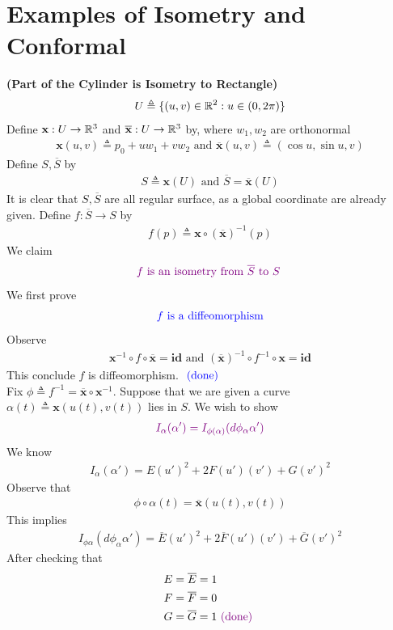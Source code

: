 \documentclass{report}
\begin{document}
\section{Examples of Isometry and Conformal}
\begin{Example}{\textbf{(Part of the Cylinder is Isometry to Rectangle)}}{}
\begin{align*}
U\triangleq \{ (u,v)\in\mathbb{R}^2: u \in (0,2\pi) \}
\end{align*}
Define $\textbf{x}:U\rightarrow \mathbb{R}^3$ and $\overline{\textbf{x}}:U\rightarrow \mathbb{R}^3$ by, where $w_1,w_2$ are orthonormal
\begin{align*}
\textbf{x}(u,v)\triangleq p_0+ uw_1+vw_2 \text{ and } \overline{\textbf{x}}(u,v)\triangleq (\cos u , \sin u , v)
\end{align*}
Define $S,\overline{S}$ by 
\begin{align*}
S\triangleq \textbf{x}(U)\text{ and } \overline{S}=\overline{\textbf{x}}(U)
\end{align*}
It is clear that $S,\overline{S}$ are all regular surface, as a global coordinate are already given. Define $f:\overline{S}\rightarrow S$ by 
\begin{align*}
f(p)\triangleq \textbf{x}\circ (\overline{\textbf{x}})^{-1}(p)
\end{align*}
We claim 
\begin{align*}
  \textcolor{violet}{f\text{ is an isometry from $\overline{S}$ to $S$ }}
\end{align*}
We first prove 
\begin{align*}
\textcolor{blue}{f\text{ is a diffeomorphism}}
\end{align*}
Observe 
\begin{align*}
  \textbf{x}^{-1} \circ f\circ \overline{\textbf{x}}=\textbf{id}\text{ and }  (\overline{\textbf{x}})^{-1}\circ  f^{-1}\circ \textbf{x}= \textbf{id}
\end{align*}
This conclude $f$ is diffeomorphism. $\textcolor{blue}{\text{ (done) }}$ \\

Fix $\phi \triangleq  f^{-1}= \overline{\textbf{x}}\circ \textbf{x}^{-1}$. Suppose that we are given a curve $\alpha (t)\triangleq \textbf{x}(u(t),v(t))$ lies in $S$. We wish to show 
 \begin{align*}
 \textcolor{violet}{I_\alpha (\alpha ')=I_{\phi (\alpha )}(d\phi_\alpha  \alpha ')}
\end{align*}
We know 
\begin{align*}
I_{\alpha }(\alpha ')=E (u')^2 + 2F(u')(v')+ G(v')^2
\end{align*}
Observe that 
\begin{align*}
\phi \circ \alpha (t)=\overline{\textbf{x}}(u(t),v(t))
\end{align*}
This implies 
\begin{align*}
I_{\phi \alpha }(d\phi_{\alpha }\alpha ')=\overline{E}(u')^2 + 2\overline{F}(u')(v')+ \overline{G}(v')^2
\end{align*}
After checking that 
\begin{align*}
E&=\overline{E}=1\\
F&=\overline{F}=0\\
G&=\overline{G}=1 \textcolor{violet}{\text{ (done) }}
\end{align*}
\end{Example}
\end{document}
